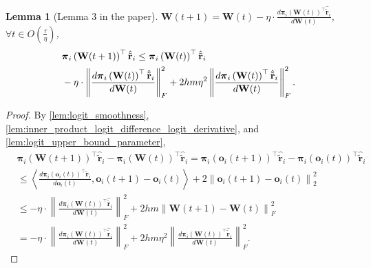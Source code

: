 \documentclass[10pt]{article}
\def\rvo{{\mathbf{o}}}
\def\rvo{{\mathbf{o}}}
\def\rvtilder{{\tilde{\mathbf{r}}}}
\newtheorem{lem}{Lemma}
\def\rvpi{{\boldsymbol{\pi}}}
\def\rmW{{\mathbf{W}}}
\begin{document}
\begin{lem}[Lemma 3 in the paper]
\label{lem:parameter_smoothness}
    $\rmW(t+1) = \rmW(t) - \eta \cdot \frac{d \rvpi_i\left(\rmW(t)\right)^\top \hat{\rvtilder}_i}{d \rmW(t)}$, $\forall t \in O\left( \frac{\tau}{\eta}\right)$,
\begin{equation}
\label{eq:parameter_smoothness}
\begin{split}
\small
    &\rvpi_i\left( \rmW(t+1) \right)^\top \hat{\rvtilder}_i \le \rvpi_i\left( \rmW(t) \right)^\top \hat{\rvtilder}_i \\
    &- \eta \cdot \left\| \frac{d \rvpi_i\left( \rmW(t) \right)^\top \hat{\rvtilder}_i}{d \rmW(t)} \right\|_F^2 + 2 h m \eta^2 \left\| \frac{d \rvpi_i\left( \rmW(t) \right)^\top \hat{\rvtilder}_i}{d \rmW(t)} \right\|_F^2.
\end{split}
\end{equation}
\end{lem}
\begin{proof}
    By \cref{lem:logit_smoothness}, \cref{lem:inner_product_logit_difference_logit_derivative}, and \cref{lem:logit_upper_bound_parameter},
\begin{equation*}
\begin{split}
    &\rvpi_i\left( \rmW(t+1) \right)^\top \hat{\rvtilder}_i - \rvpi_i\left( \rmW(t) \right)^\top \hat{\rvtilder}_i = \rvpi_i\left( \rvo_i(t+1) \right)^\top \hat{\rvtilder}_i - \rvpi_i\left( \rvo_i(t) \right)^\top \hat{\rvtilder}_i \\
    &\le \left\langle \frac{d \rvpi_i\left( \rvo_i(t) \right)^\top \rvtilder_i}{d \rvo_i(t)}, \rvo_i(t+1) - \rvo_i(t) \right\rangle + 2 \left\| \rvo_i(t+1) - \rvo_i(t)  \right\|_2^2 \\
    &\le - \eta \cdot \left\| \frac{d \rvpi_i\left(\rmW(t)\right)^\top \hat{\rvtilder}_i}{d \rmW(t)} \right\|_F^2 + 2 h m \left\| \rmW(t+1) - \rmW(t) \right\|_F^2 \\
    &= - \eta \cdot \left\| \frac{d \rvpi_i\left(\rmW(t)\right)^\top \hat{\rvtilder}_i}{d \rmW(t)} \right\|_F^2 + 2 h m \eta^2 \left\| \frac{d \rvpi_i\left(\rmW(t)\right)^\top \hat{\rvtilder}_i}{d \rmW(t)} \right\|_F^2.
\end{split}
\end{equation*}
\end{proof}
\end{document}
